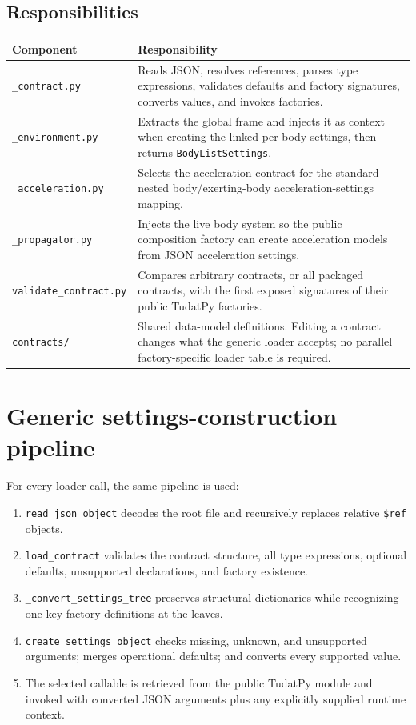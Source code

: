 \documentclass[10pt,a4paper]{article}
\newcommand{\code}[1]{\texttt{#1}}
\begin{document}
\subsection{Responsibilities}

\noindent\begin{tabularx}{\textwidth}{@{}>{\raggedright\arraybackslash}p{38mm}>{\raggedright\arraybackslash}X@{}}
\toprule
\textbf{Component} & \textbf{Responsibility} \\
\midrule
\code{\_contract.py} & Reads JSON, resolves references, parses type expressions,
validates defaults and factory signatures, converts values, and invokes factories. \\
\code{\_environment.py} & Extracts the global frame and injects it as context when
creating the linked per-body settings, then returns \code{BodyListSettings}. \\
\code{\_acceleration.py} & Selects the acceleration contract for the standard nested
body/exerting-body acceleration-settings mapping. \\
\code{\_propagator.py} & Injects the live body system so the public composition
factory can create acceleration models from JSON acceleration settings. \\
\code{validate\_contract.py} & Compares arbitrary contracts, or all packaged
contracts, with the first exposed signatures of their public TudatPy factories. \\
\code{contracts/} & Shared data-model definitions. Editing a contract changes what
the generic loader accepts; no parallel factory-specific loader table is required. \\
\bottomrule
\end{tabularx}

\section{Generic settings-construction pipeline}

For every loader call, the same pipeline is used:

\begin{enumerate}[leftmargin=7mm,itemsep=1.5mm]
  \item \code{read\_json\_object} decodes the root file and recursively replaces
        relative \code{\$ref} objects.
  \item \code{load\_contract} validates the contract structure, all type
        expressions, optional defaults, unsupported declarations, and factory
        existence.
  \item \code{\_convert\_settings\_tree} preserves structural dictionaries while
        recognizing one-key factory definitions at the leaves.
  \item \code{create\_settings\_object} checks missing, unknown, and unsupported
        arguments; merges operational defaults; and converts every supported value.
  \item The selected callable is retrieved from the public TudatPy module and
        invoked with converted JSON arguments plus any explicitly supplied runtime
        context.
\end{enumerate}
\end{document}
